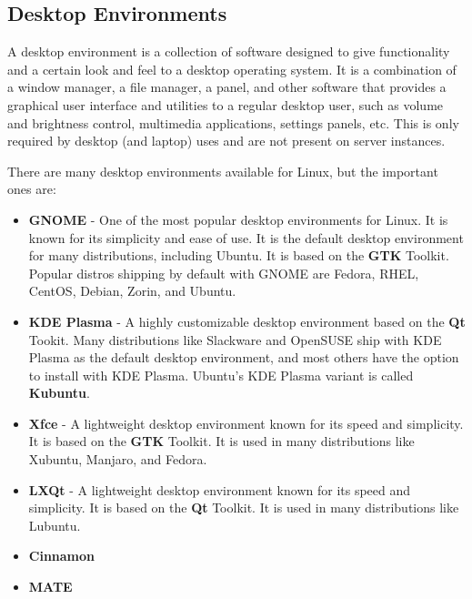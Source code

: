 \subsection{Desktop Environments}
\begin{definition}
  A desktop environment is a collection of software designed to give functionality and a certain look and feel to a desktop operating system. It is a combination of a window manager, a file manager, a panel, and other software that provides a graphical user interface and utilities to a regular desktop user, such as volume and brightness control, multimedia applications, settings panels, etc. This is only required by desktop (and laptop) uses and are not present on server instances.
\end{definition}

There are many desktop environments available for Linux, but the important ones are:

\begin{itemize}
  \item
    \textbf{GNOME} - One of the most popular desktop environments for Linux. It is known for its simplicity and ease of use. It is the default desktop environment for many distributions, including Ubuntu. It is based on the \textbf{GTK} Toolkit.
    Popular distros shipping by default with GNOME are Fedora, RHEL, CentOS, Debian, Zorin, and Ubuntu.
  \item
    \textbf{KDE Plasma} - A highly customizable desktop environment based on the \textbf{Qt} Tookit.
    Many distributions like Slackware and OpenSUSE ship with KDE Plasma as the default desktop environment, and most others have the option to install with KDE Plasma. Ubuntu's KDE Plasma variant is called \textbf{Kubuntu}.
  \item
    \textbf{Xfce} - A lightweight desktop environment known for its speed and simplicity. It is based on the \textbf{GTK} Toolkit. It is used in many distributions like Xubuntu, Manjaro, and Fedora.
  \item
    \textbf{LXQt} - A lightweight desktop environment known for its speed and simplicity. It is based on the \textbf{Qt} Toolkit. It is used in many distributions like Lubuntu.
  \item
    \textbf{Cinnamon}
  \item
    \textbf{MATE}
\end{itemize}

